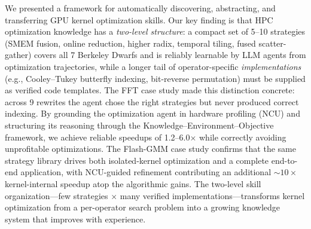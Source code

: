 \documentclass[sigconf,nonacm]{acmart}
\begin{document}
We presented a framework for automatically discovering, abstracting, and transferring GPU kernel optimization skills. Our key finding is that HPC optimization knowledge has a \emph{two-level structure}: a compact set of 5--10 strategies (SMEM fusion, online reduction, higher radix, temporal tiling, fused scatter-gather) covers all 7 Berkeley Dwarfs and is reliably learnable by LLM agents from optimization trajectories, while a longer tail of operator-specific \emph{implementations} (e.g., Cooley--Tukey butterfly indexing, bit-reverse permutation) must be supplied as verified code templates. The FFT case study made this distinction concrete: across 9 rewrites the agent chose the right strategies but never produced correct indexing. By grounding the optimization agent in hardware profiling (NCU) and structuring its reasoning through the Knowledge--Environment--Objective framework, we achieve reliable speedups of 1.2--6.0$\times$ while correctly avoiding unprofitable optimizations. The Flash-GMM case study confirms that the same strategy library drives both isolated-kernel optimization and a complete end-to-end application, with NCU-guided refinement contributing an additional $\sim\!10\times$ kernel-internal speedup atop the algorithmic gains. The two-level skill organization---few strategies $\times$ many verified implementations---transforms kernel optimization from a per-operator search problem into a growing knowledge system that improves with experience.



\end{document}
